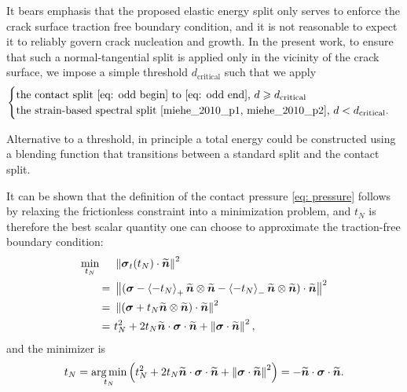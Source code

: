 It bears emphasis that the proposed elastic energy split only serves to enforce the crack surface traction free boundary condition, and it is not reasonable to expect it to reliably govern crack nucleation and growth. In the present work, to ensure that such a normal-tangential split is  applied only in the vicinity of the crack surface, we impose a simple threshold $d_{\text{critical}}$ such that we apply
\begin{align*}
  \begin{cases}
    \text{the contact split \eqref{eq: odd begin} to \eqref{eq: odd end}, } d \geqslant d_{\text{critical}} \\
    \text{the strain-based spectral split \cite{miehe_2010_p1, miehe_2010_p2}, } d < d_{\text{critical}}.
  \end{cases}
\end{align*}

\begin{remark}
  Alternative to a threshold, in principle a total energy could be constructed using a blending function that transitions between a standard split and the contact split.
\end{remark}

It can be shown that the definition of the contact pressure \eqref{eq: pressure} follows by relaxing the frictionless constraint into a minimization problem, and $t_N$ is therefore the best scalar quantity one can choose to approximate the traction-free boundary condition:
\begin{subequations}
  \begin{align}
    \min\limits_{t_N} \quad & \ \norm{\stress_t(t_N)\cdot\xnormal}^2                                                                               \\
    =                       & \ \norm{(\stress-\macaulay{-t_N}_+\xnormal\otimes\xnormal-\macaulay{-t_N}_- \xnormal\otimes\xnormal)\cdot\xnormal}^2 \\
    =                       & \ \norm{(\stress+t_N \xnormal\otimes\xnormal)\cdot\xnormal}^2                                                        \\
    =                       & \ t_N^2 + 2t_N\xnormal\cdot\stress\cdot\xnormal + \norm{\stress\cdot\xnormal}^2,
  \end{align}
\end{subequations}
and the minimizer is
\begin{align}
  t_N = \operatorname*{arg\,min}\limits_{t_N} \left( t_N^2 + 2t_N\widetilde{\boldsymbol{n}}\cdot\boldsymbol{\sigma}\cdot\widetilde{\boldsymbol{n}} + \left\lVert\boldsymbol{\sigma}\cdot\widetilde{\boldsymbol{n}}\right\rVert^2 \right) = -\widetilde{\boldsymbol{n}}\cdot\boldsymbol{\sigma}\cdot\widetilde{\boldsymbol{n}} .
\end{align}

